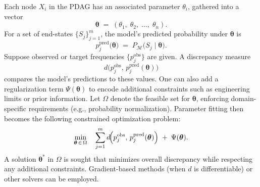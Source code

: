 Each node \(X_i\) in the PDAG has an associated parameter \(\theta_i\), gathered into a vector  
\[
\boldsymbol{\theta}
\;=\;
(\theta_1,\;\theta_2,\;\dots,\;\theta_n).
\]
For a set of end-states \(\{S_j\}_{j=1}^m\), the model’s predicted probability under \(\boldsymbol{\theta}\) is  
\[
p_{j}^{\mathrm{pred}}\bigl(\boldsymbol{\theta}\bigr)
\;=\;
P_{\mathcal{M}}\bigl(S_j \mid \boldsymbol{\theta}\bigr).
\]
Suppose observed or target frequencies \(\bigl\{p_{j}^{\mathrm{obs}}\bigr\}\) are given. A discrepancy measure  
\[
d\!\bigl(p_{j}^{\mathrm{obs}},\,p_{j}^{\mathrm{pred}}(\boldsymbol{\theta})\bigr)
\]
compares the model’s predictions to these values. One can also add a regularization term \(\Psi(\boldsymbol{\theta})\) to encode additional constraints such as engineering limits or prior information. Let \(\Omega\) denote the feasible set for \(\boldsymbol{\theta}\), enforcing domain-specific requirements (e.g., probability normalization). Parameter fitting then becomes the following constrained optimization problem:
\[
\min_{\boldsymbol{\theta} \,\in\, \Omega} 
\quad 
\sum_{j=1}^m
d\!\Bigl(
   p_{j}^{\mathrm{obs}},\,
   p_{j}^{\mathrm{pred}}(\boldsymbol{\theta})
\Bigr)
\;+\;
\Psi(\boldsymbol{\theta}).
\]
A solution \(\boldsymbol{\theta}^{*}\) in \(\Omega\) is sought that minimizes overall discrepancy while respecting any additional constraints. Gradient-based methods (when \(d\) is differentiable) or other solvers can be employed.




